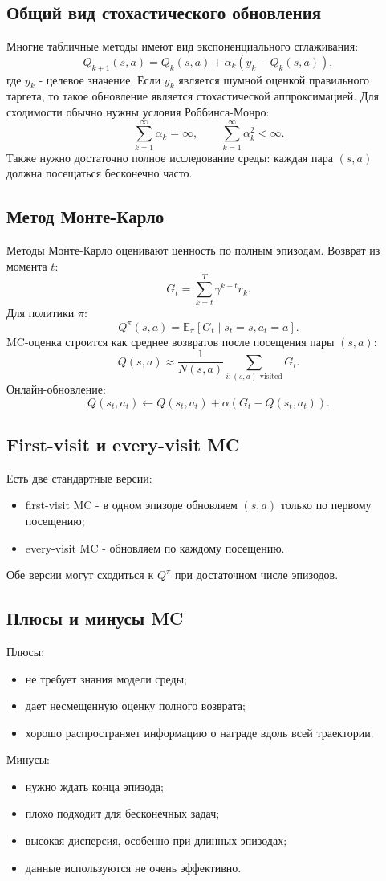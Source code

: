 \documentclass[11pt,a4paper]{article}
\newcommand{\E}{\mathbb{E}}
\newcommand{\1}{\mathbf{1}}
\begin{document}
\subsection*{Общий вид стохастического обновления}
Многие табличные методы имеют вид экспоненциального сглаживания:
\[
    Q_{k+1}(s,a)=Q_k(s,a)+\alpha_k\left(y_k-Q_k(s,a)\right),
\]
где $y_k$ - целевое значение. Если $y_k$ является шумной оценкой правильного таргета, то такое обновление является стохастической аппроксимацией. Для сходимости обычно нужны условия Роббинса-Монро:
\[
    \sum_{k=1}^\infty \alpha_k=\infty,
    \qquad
    \sum_{k=1}^\infty \alpha_k^2<\infty.
\]
Также нужно достаточно полное исследование среды: каждая пара $(s,a)$ должна посещаться бесконечно часто.

\subsection*{Метод Монте-Карло}
Методы Монте-Карло оценивают ценность по полным эпизодам. Возврат из момента $t$:
\[
    G_t=\sum_{k=t}^{T}\gamma^{k-t}r_k.
\]
Для политики $\pi$:
\[
    Q^\pi(s,a)=\E_\pi[G_t\mid s_t=s,a_t=a].
\]
MC-оценка строится как среднее возвратов после посещения пары $(s,a)$:
\[
    Q(s,a)\approx \frac1{N(s,a)}\sum_{i: (s,a)\text{ visited}}G_i.
\]
Онлайн-обновление:
\[
    Q(s_t,a_t)\leftarrow Q(s_t,a_t)+\alpha\left(G_t-Q(s_t,a_t)\right).
\]

\subsection*{First-visit и every-visit MC}
Есть две стандартные версии:
\begin{itemize}
    \item first-visit MC - в одном эпизоде обновляем $(s,a)$ только по первому посещению;
    \item every-visit MC - обновляем по каждому посещению.
\end{itemize}
Обе версии могут сходиться к $Q^\pi$ при достаточном числе эпизодов.

\subsection*{Плюсы и минусы MC}
Плюсы:
\begin{itemize}
    \item не требует знания модели среды;
    \item дает несмещенную оценку полного возврата;
    \item хорошо распространяет информацию о награде вдоль всей траектории.
\end{itemize}
Минусы:
\begin{itemize}
    \item нужно ждать конца эпизода;
    \item плохо подходит для бесконечных задач;
    \item высокая дисперсия, особенно при длинных эпизодах;
    \item данные используются не очень эффективно.
\end{itemize}
\end{document}
